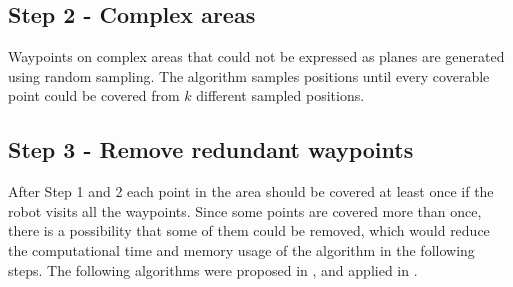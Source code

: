 
\subsection{Step 2 - Complex areas}

Waypoints on complex areas that could not be expressed as planes are generated using random sampling. The algorithm samples positions until every coverable point could be covered from $k$ different sampled positions. 





\subsection{Step 3 - Remove redundant waypoints}
After Step 1 and 2 each point in the area should be covered at least once if the robot visits all the waypoints. Since some points are covered more than once, there is a possibility that some of them could be removed, which would reduce the computational time and memory usage of the algorithm in the following steps. The following algorithms were proposed in \cite{JOHNSON1974256}, and applied in \cite{6386126}.

